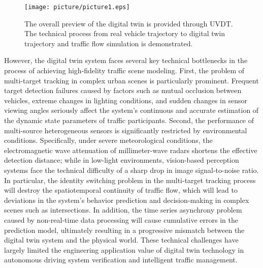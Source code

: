 \documentclass[journal,twoside,web]{ieeecolor}
\begin{document}
\begin{figure}[!t]
	\centerline{\texttt{[image: picture/picture1.eps]}}
	\caption{The overall preview of the digital twin is provided through UVDT. The technical process from real vehicle trajectory to digital twin trajectory and traffic flow simulation is demonstrated.}
	\label{fig:1}
\end{figure}

However, the digital twin system faces several key technical bottlenecks in the process of achieving high-fidelity traffic scene modeling.
First, the problem of multi-target tracking in complex urban scenes is particularly prominent. Frequent target detection failures caused by factors such as mutual occlusion between vehicles, extreme changes in lighting conditions, and sudden changes in sensor viewing angles seriously affect the system's continuous and accurate estimation of the dynamic state parameters of traffic participants\cite{Alpher23c}.
Second, the performance of multi-source heterogeneous sensors is significantly restricted by environmental conditions. Specifically, under severe meteorological conditions, the electromagnetic wave attenuation of millimeter-wave radars shortens the effective detection distance; while in low-light environments, vision-based perception systems face the technical difficulty of a sharp drop in image signal-to-noise ratio.
In particular, the identity switching problem in the multi-target tracking process will destroy the spatiotemporal continuity of traffic flow, which will lead to deviations in the system's behavior prediction and decision-making in complex scenes such as intersections.
In addition, the time series asynchrony problem caused by non-real-time data processing will cause cumulative errors in the prediction model, ultimately resulting in a progressive mismatch between the digital twin system and the physical world.
These technical challenges have largely limited the engineering application value of digital twin technology in autonomous driving system verification and intelligent traffic management.
\end{document}

